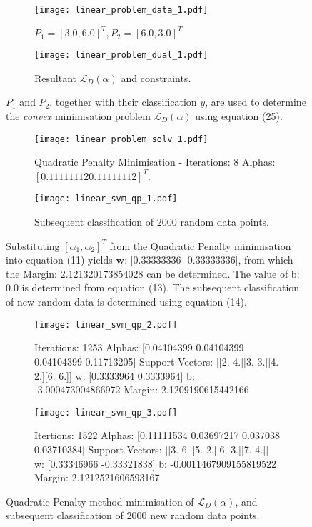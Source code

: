 \documentclass[10pt, a4paper,reqno]{amsart}
\begin{document}
\begin{figure}[H]
	\centering	
	\begin{subfigure}{1.0\textwidth}
		\centering
		\texttt{[image: linear\_problem\_data\_1.pdf]}
		\caption{$P_1 = [3.0, 6.0]^T, P_2 = [6.0, 3.0]^T$}
	\end{subfigure}
	\begin{subfigure}{1.0\textwidth}
		\centering
		\texttt{[image: linear\_problem\_dual\_1.pdf]}
		\caption{Resultant $\mathcal{L}_D(\alpha)$ and constraints.}
	\end{subfigure}
	\caption{$P_1$ and $P_2$, together with their classification $y$, are used to determine the \emph{convex} minimisation problem $\mathcal{L}_D(\alpha)$ using equation (25).}
\end{figure}

\begin{figure}[H]
	\centering	
	\begin{subfigure}{1.0\textwidth}
		\centering
		\texttt{[image: linear\_problem\_solv\_1.pdf]}
		\caption{Quadratic Penalty Minimisation - Iterations: 8 Alphas: $[0.11111112 0.11111112]^T$.}
	\end{subfigure}
	\begin{subfigure}{1.0\textwidth}
		\centering
		\texttt{[image: linear\_svm\_qp\_1.pdf]}
		\caption{Subsequent classification of 2000 random data points.}
	\end{subfigure}
	\caption{Substituting $[\alpha_1, \alpha_2]^T$ from the Quadratic Penalty minimisation into equation (11) yields $\mathbf{w}$:
 [0.33333336 -0.33333336], from which the Margin: 2.121320173854028 can be determined. The value of b: 0.0 is determined from equation (13). The subsequent classification of new random data is determined using equation (14).}
\end{figure}

\begin{figure}[H]
	\centering	
	\begin{subfigure}{1.0\textwidth}
		\centering
		\texttt{[image: linear\_svm\_qp\_2.pdf]}
		\caption{Iterations: 1253 Alphas: [0.04104399 0.04104399 0.04104399 0.11713205] Support Vectors: [[2. 4.][3. 3.][4. 2.][6. 6.]] w: [0.3333964 0.3333964] b: -3.000473004866972 Margin: 2.1209190615442166}
	\end{subfigure}
	\begin{subfigure}{1.0\textwidth}
		\centering
		\texttt{[image: linear\_svm\_qp\_3.pdf]}
		\caption{Itertions: 1522 Alphas: [0.11111534 0.03697217 0.037038   0.03710384] Support Vectors: [[3. 6.][5. 2.][6. 3.][7. 4.]] w: [0.33346966 -0.33321838] b: -0.0011467909155819522 Margin: 2.1212521606593167}
	\end{subfigure}
	\caption{Quadratic Penalty method minimisation of $\mathcal{L}_D(\alpha)$, and subsequent classification of 2000 new random data points.}
\end{figure}
\end{document}
